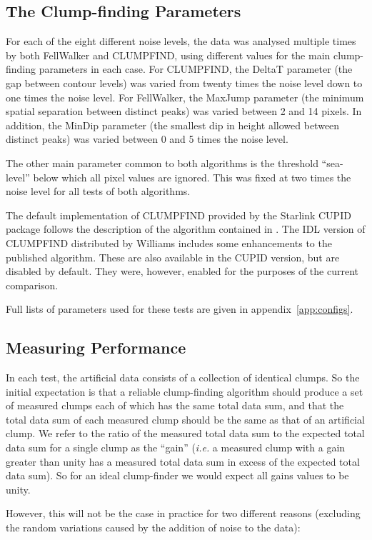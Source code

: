 \documentclass[final,authoryear,5p,times,twocolumn]{elsarticle}
\begin{document}
\subsection{The Clump-finding Parameters}
For each of the eight different noise levels, the data was analysed
multiple times by both FellWalker and CLUMPFIND, using different values
for the main clump-finding parameters in each case. For CLUMPFIND, the
DeltaT parameter (the gap between contour levels) was varied from twenty
times the noise level down to one times the noise level. For FellWalker,
the MaxJump parameter (the minimum spatial separation between distinct
peaks) was varied between 2 and 14 pixels. In addition, the MinDip
parameter (the smallest dip in height allowed between distinct peaks) was
varied between 0 and 5 times the noise level.

The other main parameter common to both algorithms is the threshold
``sea-level'' below which all pixel values are ignored. This was fixed at
two times the noise level for all tests of both algorithms.

The default implementation of CLUMPFIND provided by the Starlink CUPID
package follows the description of the algorithm contained in
\citet{1994Williams}. The IDL version of CLUMPFIND distributed by Williams
includes some enhancements to the published algorithm. These are also
available in the CUPID version, but are disabled by default. They were,
however, enabled for the purposes of the current comparison.

Full lists of parameters used for these tests are given in
appendix~\ref{app:configs}.

\subsection{Measuring Performance}
In each test, the artificial data consists of a collection of identical
clumps. So the initial expectation is that a reliable clump-finding
algorithm should produce a set of measured clumps each of which has the
same total data sum, and that the total data sum of each measured clump
should be the same as that of an artificial clump. We refer to the ratio
of the measured total data sum to the expected total data sum for a
single clump as the ``gain'' (\emph{i.e.} a measured clump with a gain
greater than unity has a measured total data sum in excess of the expected
total data sum). So for an ideal clump-finder we would expect all gains values
to be unity.

However, this will not be the case in practice for two different reasons
(excluding the random variations caused by the addition of noise to the
data):
\end{document}

